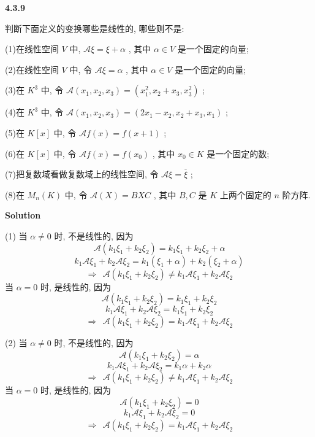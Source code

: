 \documentclass[11pt,a4paper,openany,oneside]{book}
\newcommand\Solution{\noindent\textbf{\textsf{Solution}}\par\medskip}
\begin{document}
\begin{myexample}
	\textbf{4.3.9}

判断下面定义的变换哪些是线性的, 哪些则不是:

(1)在线性空间 $ V $ 中,  $ \mathcal{A}\xi = \xi + \alpha $ , 其中 $ \alpha \in V $ 是一个固定的向量;

(2)在线性空间 $ V $ 中, 令 $ \mathcal{A}\xi = \alpha $ , 其中 $ \alpha \in V $ 是一个固定的向量;

(3)在 $ K^3 $ 中, 令 $ \mathcal{A}(x_1, x_2, x_3) = (x_1^2, x_2+x_3, x_3^2) $ ;

(4)在 $ K^3 $ 中, 令 $ \mathcal{A}(x_1, x_2, x_3) = (2x_1-x_2, x_2 + x_3 , x_1) $ ;

(5)在 $ K[x] $ 中, 令 $ \mathcal{A}f(x) = f(x+1) $ ;

(6)在 $ K[x] $ 中, 令 $ \mathcal{A}f(x) = f(x_0) $ , 其中 $ x_0 \in K $ 是一个固定的数;

(7)把复数域看做复数域上的线性空间, 令 $ \mathcal{A}\xi = \overline{\xi} $ ;

(8)在 $ M_n(K) $ 中, 令 $ \mathcal{A}(X) = BXC $ , 其中 $ B,C $ 是 $ K $ 上两个固定的 $ n $ 阶方阵.  \\

\end{myexample}
\Solution

(1) 当 $ \alpha \neq 0 $ 时, 不是线性的, 因为
 $$  \mathcal{A}(k_1\xi_1 + k_2\xi_2) = k_1\xi_1 + k_2\xi_2 + \alpha   $$  
 $$  k_1\mathcal{A}\xi_1 + k_2\mathcal{A}\xi_2 = k_1(\xi_1 + \alpha) + k_2(\xi_2 + \alpha)  $$ 
 $$  \Longrightarrow \ \ \mathcal{A}(k_1\xi_1 + k_2\xi_2) \neq k_1\mathcal{A}\xi_1 + k_2\mathcal{A}\xi_2  $$ 
\hspace{1.5em} 当 $ \alpha = 0 $ 时, 是线性的, 因为
 $$  \mathcal{A}(k_1\xi_1 + k_2\xi_2) = k_1\xi_1 + k_2\xi_2   $$  
 $$  k_1\mathcal{A}\xi_1 + k_2\mathcal{A}\xi_2 = k_1\xi_1  + k_2\xi_2   $$ 
 $$  \Longrightarrow \ \ \mathcal{A}(k_1\xi_1 + k_2\xi_2) = k_1\mathcal{A}\xi_1 + k_2\mathcal{A}\xi_2  $$ 

(2) 当 $ \alpha \neq 0 $ 时, 不是线性的, 因为
 $$  \mathcal{A}(k_1\xi_1 + k_2\xi_2) = \alpha     $$ 
 $$  k_1\mathcal{A}\xi_1 + k_2\mathcal{A}\xi_2 = k_1\alpha + k_2\alpha  $$ 
 $$  \Longrightarrow \ \ \mathcal{A}(k_1\xi_1 + k_2\xi_2) \neq  k_1\mathcal{A}\xi_1 + k_2\mathcal{A}\xi_2  $$ 
\hspace{1.5em} 当 $ \alpha = 0 $ 时, 是线性的, 因为
 $$  \mathcal{A}(k_1\xi_1 + k_2\xi_2) = 0    $$ 
 $$  k_1\mathcal{A}\xi_1 + k_2\mathcal{A}\xi_2 =0  $$ 
 $$  \Longrightarrow \ \ \mathcal{A}(k_1\xi_1 + k_2\xi_2) =  k_1\mathcal{A}\xi_1 + k_2\mathcal{A}\xi_2  $$ 
\end{document}
